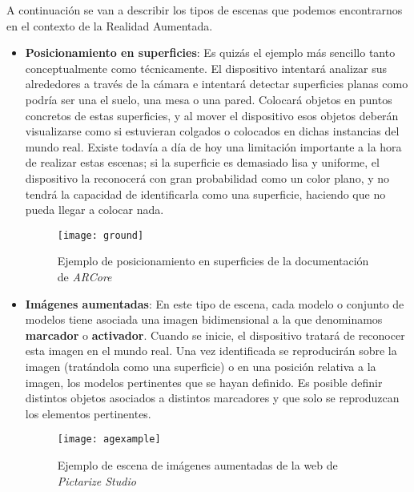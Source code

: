 A continuación se van a describir los tipos de escenas que podemos encontrarnos en el contexto de la Realidad Aumentada.

\begin{itemize}
    \item \textbf{Posicionamiento en superficies}: Es quizás el ejemplo más sencillo tanto conceptualmente como técnicamente. El dispositivo intentará analizar sus alrededores a través de la cámara e intentará detectar superficies planas como podría ser una el suelo, una mesa o una pared. Colocará objetos en puntos concretos de estas superficies, y al mover el dispositivo esos objetos deberán visualizarse como si estuvieran colgados o colocados en dichas instancias del mundo real. Existe todavía a día de hoy una limitación importante a la hora de realizar estas escenas; si la superficie es demasiado lisa y uniforme, el dispositivo la reconocerá con gran probabilidad como un color plano, y no tendrá la capacidad de identificarla como una superficie, haciendo que no pueda llegar a colocar nada.
    
    \begin{figure}[h]
        \centering
        \texttt{[image: ground]}
        \caption[Ejemplo ground]{Ejemplo de posicionamiento en superficies de la documentación de \textit{ARCore}\cite{arcore}}
    \end{figure}

    \item \textbf{Imágenes aumentadas}: En este tipo de escena, cada modelo o conjunto de modelos tiene asociada una imagen bidimensional a la que denominamos \textbf{marcador} o \textbf{activador}. Cuando se inicie, el dispositivo tratará de reconocer esta imagen en el mundo real. Una vez identificada se reproducirán sobre la imagen (tratándola como una superficie) o en una posición relativa a la imagen, los modelos pertinentes que se hayan definido. Es posible definir distintos objetos asociados a distintos marcadores y que solo se reproduzcan los elementos pertinentes.
    
    \begin{figure}[h]
        \centering
        \texttt{[image: agexample]}
        \caption[Ejemplo ground]{Ejemplo de escena de imágenes aumentadas de la web de \textit{Pictarize Studio}\cite{pictarize}}
    \end{figure}


\end{itemize}
